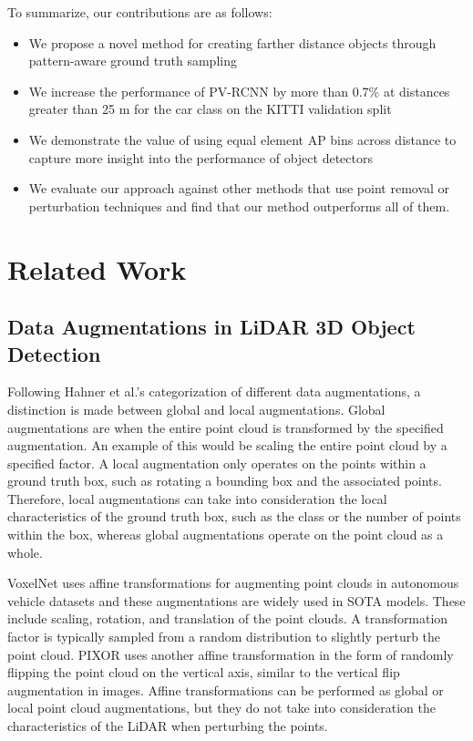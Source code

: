 \documentclass[10pt, conference, compsocconf]{IEEEtran}
\begin{document}
To summarize, our contributions are as follows:

\begin{itemize}
    \item We propose a novel method for creating farther distance objects through pattern-aware ground truth sampling
    \item We increase the performance of PV-RCNN by more than 0.7\% at distances greater than 25 m for the car class on the KITTI validation split
    \item We demonstrate the value of using equal element AP bins across distance to capture more insight into the performance of object detectors
    \item We evaluate our approach against other methods that use point removal or perturbation techniques and find that our method outperforms all of them.
\end{itemize}

\section{Related Work}

\subsection{Data Augmentations in LiDAR 3D Object Detection}\label{ssec:related-work-data-aug}
Following Hahner et al.'s \cite{Hahner2020} categorization of different data augmentations, a distinction is made between global and local augmentations. Global augmentations are when the entire point cloud is transformed by the specified augmentation. An example of this would be scaling the entire point cloud by a specified factor. A local augmentation only operates on the points within a ground truth box, such as rotating a bounding box and the associated points. Therefore, local augmentations can take into consideration the local characteristics of the ground truth box, such as the class or the number of points within the box, whereas global augmentations operate on the point cloud as a whole.

VoxelNet \cite{Zhou2018} uses affine transformations for augmenting point clouds in autonomous vehicle datasets and these augmentations are widely used in SOTA models. These include scaling, rotation, and translation of the point clouds. A transformation factor is typically sampled from a random distribution to slightly perturb the point cloud. PIXOR \cite{Yang2018} uses another affine transformation in the form of randomly flipping the point cloud on the vertical axis, similar to the vertical flip augmentation in images. Affine transformations can be performed as global or local point cloud augmentations, but they do not take into consideration the characteristics of the LiDAR when perturbing the points.
\end{document}
